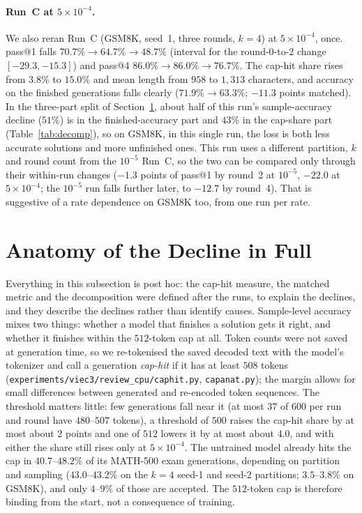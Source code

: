 \documentclass[runningheads]{llncs}
\begin{document}
\paragraph{Run~C at $5\times10^{-4}$.}
We also reran Run~C (GSM8K, seed~1, three rounds, $k=4$) at $5\times10^{-4}$, once.
pass@1 falls $70.7\%\to64.7\%\to48.7\%$ (interval for the round-0-to-2 change
$[-29.3,-15.3]$) and pass@4 $86.0\%\to86.0\%\to76.7\%$. The cap-hit share rises from
$3.8\%$ to $15.0\%$ and mean length from $958$ to $1{,}313$ characters, and
accuracy on the finished generations falls clearly ($71.9\%\to63.3\%$; $-11.3$
points matched). In the three-part split of Section~\ref{app:anatomy}, about
half of this run's sample-accuracy decline ($51\%$) is in the finished-accuracy
part and $43\%$ in the cap-share part (Table~\ref{tab:decomp}), so on GSM8K, in this single run, the loss is
both less accurate solutions and more unfinished ones. This
run uses a different partition, $k$ and round count from the $10^{-5}$ Run~C, so
the two can be compared only through their within-run changes ($-1.3$ points of
pass@1 by round~2 at $10^{-5}$, $-22.0$ at $5\times10^{-4}$; the $10^{-5}$ run
falls further later, to $-12.7$ by round~4). That is suggestive
of a rate dependence on GSM8K too, from one run per rate.

\section{Anatomy of the Decline in Full}
\label{app:anatomy}

Everything in this subsection is post hoc: the cap-hit measure, the matched
metric and the decomposition were defined after the runs, to explain the
declines, and they describe the declines rather than identify causes.
Sample-level accuracy mixes two things: whether a model that finishes a solution
gets it right, and whether it finishes within the $512$-token cap at all. Token
counts were not saved at generation time, so we re-tokenised the saved decoded
text with the model's tokenizer and call a generation \emph{cap-hit} if it has at
least $508$ tokens (\texttt{experiments/viec3/review\_cpu/caphit.py},
\texttt{capanat.py}); the margin allows for small differences between generated
and re-encoded token sequences. The threshold matters little: few generations
fall near it (at most $37$ of $600$ per run and round have $480$--$507$ tokens),
a threshold of $500$ raises the cap-hit share by at most about $2$ points and
one of $512$ lowers it by at most about $4.0$, and with either the share still
rises only at $5\times10^{-4}$. The untrained model already hits the cap in
$40.7$--$48.2\%$ of its MATH-500 exam generations, depending on partition and
sampling ($43.0$--$43.2\%$ on the $k=4$ seed-1 and seed-2 partitions; $3.5$--$3.8\%$
on GSM8K), and only $4$--$9\%$ of those are accepted.
The $512$-token cap is therefore binding from the start, not a consequence of
training.
\end{document}
